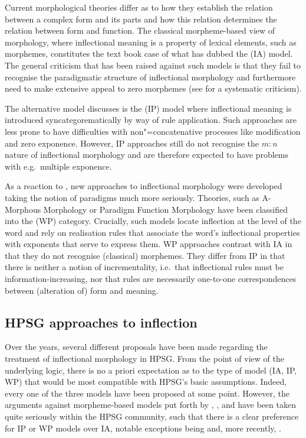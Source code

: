 \documentclass[output=paper,biblatex,babelshorthands,newtxmath,draftmode,colorlinks,citecolor=brown]{langscibook}
\begin{document}
Current morphological theories differ as to how they establish the
relation between a complex form and its parts and how this relation
determines the relation between form and function. The classical
morpheme-based view of morphology, where inflectional meaning is a
property of lexical elements, such as morphemes, constitutes the text
book case of what \citet{Hockett54} has dubbed the 
(IA) model.  The general criticism that has been raised against such
models is that they fail to recognise the paradigmatic structure of
inflectional morphology and furthermore need to make extensive appeal
to zero morphemes (see \citealp{Anderson92} for a systematic
criticism).

The alternative model \citet{Hockett54} discusses is the
 (IP) model where inflectional meaning is introduced
syncategorematically by way of rule application. Such approaches
are less prone to have difficulties with non"=concatenative processes
like modification and zero exponence. However, IP approaches still do
not recognise the $m:n$ nature of inflectional morphology and are
therefore expected to have problems with e.g.\ multiple exponence. 


As a reaction to \citet{Matthews72}, new approaches to inflectional
morphology were developed taking the notion of paradigms much more
seriously. Theories, such as A-Morphous Morphology \citep{Anderson92}
or Paradigm Function Morphology \citep{Stump01} have been classified
into the  (WP) category. Crucially, such models
locate inflection at the level of the word and rely on realisation
rules that associate the word's inflectional properties with exponents
that serve to express them. WP approaches contrast with IA in that
they do not recognise (classical) morphemes. They differ from IP in
that there is neither a notion of incrementality, i.e.\ that
inflectional rules must be information-increasing, nor that rules are
necessarily one-to-one correspondences between (alteration of) form
and meaning.


\subsection{HPSG approaches to inflection}
\label{sec:InflHPSG}

Over the years, several different proposals have been made regarding the
treatment of inflectional morphology in HPSG. From the point of view
of the underlying logic, there is no a priori expectation as to the type of model
(IA, IP, WP) that would be most compatible with HPSG's basic
assumptions. Indeed, every one of the three models have been proposed at
some point. However, the arguments against morpheme-based models put
forth by \citet{Matthews72}, \citet{Spencer91}, \citet{Anderson92} and
\citet{Stump01} have been taken quite seriously within the HPSG
community, such that there is a clear preference for IP or WP models over
IA, notable exceptions being \citet{van-eynde_f94} and, more
recently, \citet{Emerson15}.
\end{document}
